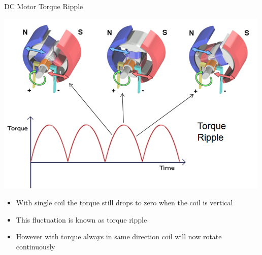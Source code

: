 \documentclass[compress]{beamer}
\begin{document}
\begin{frame}{DC Motor Torque Ripple}

    \begin{center}
        \includegraphics[height=0.4\paperheight]{image24}\hspace{1em}
    \end{center}

\begin{itemize}
\item With single coil the torque still drops to zero when the coil is
  vertical
\item This fluctuation is known as torque ripple
\item However with torque always in same direction coil will now rotate
  continuously
\end{itemize}

\end{frame}
\end{document}
